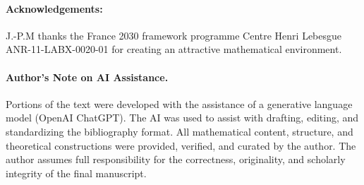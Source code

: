 \documentclass[11pt]{amsart}
\theoremstyle{definition}
\theoremstyle{plain}
\newtheorem{proposition}[definition]{Proposition}
\numberwithin{equation}{section}
\begin{document}




\vskip 12pt

\paragraph{\bf Acknowledgements:} J.-P.M thanks the France 2030 framework programme Centre Henri Lebesgue ANR-11-LABX-0020-01 
for creating an attractive mathematical environment.

\vskip 12pt

\paragraph{\bf Author's Note on AI Assistance.}
Portions of the text were developed with the assistance of a generative language model (OpenAI ChatGPT). The AI was used to assist with drafting, editing, and standardizing the bibliography format. All mathematical content, structure, and theoretical constructions were provided, verified, and curated by the author. The author assumes full responsibility for the correctness, originality, and scholarly integrity of the final manuscript.
\end{document}
